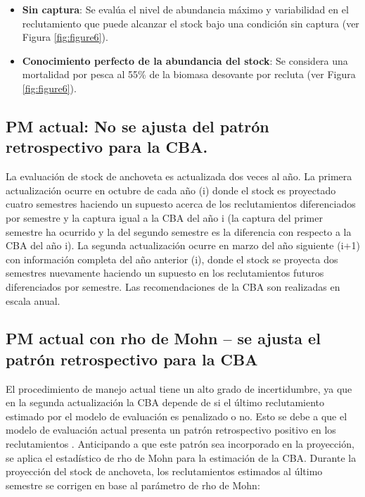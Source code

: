 \begin{itemize}
    \item \textbf{Sin captura}: Se evalúa el nivel de abundancia máximo y variabilidad en el reclutamiento que puede alcanzar el stock bajo una condición sin captura (ver Figura \ref{fig:figure6}). 
    \item \textbf{Conocimiento perfecto de la abundancia del stock}: Se considera una mortalidad por pesca al 55\% de la biomasa desovante por recluta (ver Figura \ref{fig:figure6}). 
\end{itemize}


\subsection{PM actual: No se ajusta del patrón retrospectivo para la CBA.}

La evaluación de stock de anchoveta es actualizada dos veces al año. La primera actualización ocurre en octubre de cada año (i) donde el stock es proyectado cuatro semestres haciendo un supuesto acerca de los reclutamientos diferenciados por semestre y la captura igual a la CBA del año i (la captura del primer semestre ha ocurrido y la del segundo semestre es la diferencia con respecto a la CBA del año i). La segunda actualización ocurre en marzo del año siguiente (i+1) con información completa del año anterior (i), donde el stock se proyecta dos semestres nuevamente haciendo un supuesto en los reclutamientos futuros diferenciados por semestre. Las recomendaciones de la CBA son realizadas en escala anual.

\subsection{PM actual con rho de Mohn – se ajusta el patrón retrospectivo para la CBA}

El procedimiento de manejo actual tiene un alto grado de incertidumbre, ya que en la segunda actualización la CBA depende de si el último reclutamiento estimado por el modelo de evaluación es penalizado o no. Esto se debe a que el modelo de evaluación actual presenta un patrón retrospectivo positivo en los reclutamientos \citep{espinola2023}. Anticipando a que este patrón sea incorporado en la proyección, se aplica el estadístico de rho de Mohn \citep{mohn1999retrospective,hurtado2015looking,huynh2022closed} para la estimación de la CBA. Durante la proyección del stock de anchoveta, los reclutamientos
estimados al último semestre se corrigen en base al parámetro de rho de Mohn: 
\newline


